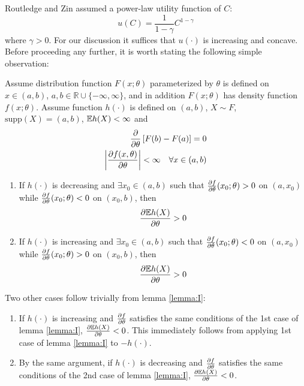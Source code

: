 \documentclass{article}
\begin{document}
Routledge and Zin \cite{routledge2010generalized} assumed
a power-law utility function of $C$:
\begin{equation}
  \label{eq:power_utility}
  u(C)=\frac{1}{1-\gamma}C^{1-\gamma}%
\end{equation}
where $\gamma > 0$. For our discussion it suffices that $u(\cdot)$ is
increasing and concave. Before proceeding any further, it is worth
stating the following simple observation:
\begin{lemma} \label{lemma:I}
  Assume distribution function $F(x; \theta)$ parameterized by
  $\theta$ is defined on $x \in (a, b)$, $a, b \in \mathbb R \cup
  \{-\infty, \infty\}$, and in addition $F(x; \theta)$ has density
  function $f(x; \theta)$. Assume function $h(\cdot)$ is defined on
  $(a, b)$, $X \sim F$, $\text{supp}(X) = (a,b)$,
  $\mathbb{E} h(X) < \infty$ and
  \begin{eqnarray*}
    \frac{\partial}{\partial \theta}\left[
      F(b) - F(a)
    \right] = 0 \\
    \left| \frac{\partial f(x, \theta)}{\partial \theta} \right| < \infty
    \quad \forall x \in (a, b)
  \end{eqnarray*}
  \begin{enumerate}
  \item If $h(\cdot)$ is decreasing and $\exists x_0 \in (a, b)$ such that
    $\frac{\partial f}{\partial \theta}(x_0; \theta) > 0$ on $(a, x_0)$ while
    $\frac{\partial f}{\partial \theta}(x_0; \theta) < 0$ on $(x_0, b)$, then
    \[
    \frac{\partial \mathbb{E} h(X)}{\partial \theta} > 0
    \]
  \item If $h(\cdot)$ is increasing and $\exists x_0 \in (a, b)$ such that 
    $\frac{\partial f}{\partial \theta}(x_0; \theta) < 0$ on $(a, x_0)$  while
    $\frac{\partial f}{\partial \theta}(x_0; \theta) > 0$ on $(x_0, b)$, then
    \[
    \frac{\partial \mathbb{E} h(X)}{\partial \theta} > 0
    \]
  \end{enumerate}
\end{lemma}
\begin{remark}
  \label{remark:I}
  Two other cases follow trivially from lemma \ref{lemma:I}:
  \begin{enumerate}
  \item If $h(\cdot)$ is increasing and $\frac{\partial f}{\partial \theta}$ satisfies the
    same conditions of the 1st case of lemma \ref{lemma:I},
    $\frac{\partial \mathbb{E} h(X)}{\partial \theta} < 0$. This immediately follows from applying
    1st case of lemma \ref{lemma:I} to $-h(\cdot)$.
  \item By the same argument, if $h(\cdot)$ is decreasing and
    $\frac{\partial f}{\partial \theta}$ satisfies the same conditions of the 2nd case of
    lemma \ref{lemma:I}, $\frac{\partial \mathbb{E} h(X)}{\partial \theta} < 0$.
  \end{enumerate}
\end{remark}
\end{document}
